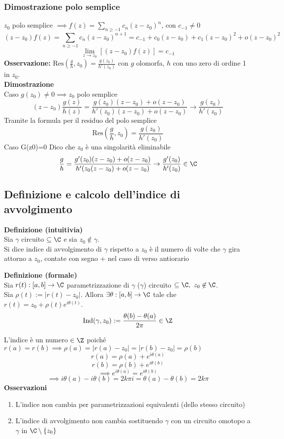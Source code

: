 \subsubsection*{Dimostrazione polo semplice}
$z_0$ polo semplice $\implies f(z)=\sum_{n\ge -1}^{} c_n(z-z_0)^n$, con $c_{-1}\neq  0$
\[(z-z_0)f(z)=\sum_{n\ge -1}^{} c_n(z-z_0)^{n+1}=c_{-1}+c_0(z-z_0)+c_1(z-z_0)^2+o(z-z_0)^2\]
\[\lim_{z \to z_0} [(z-z_0)f(z)]=c_{-1}\]
\textbf{Osservazione:} $\text{Res}(\frac{g}{h},z_0)=\frac{g(z_0)}{h'(z_0)}$ con $g$ olomorfa, $h$ con uno zero di ordine 1 in $z_0$.\\
\textbf{Dimostrazione}\\
Caso $g(z_0)\neq 0\implies z_0$ polo semplice 
\[(z-z_0) \frac{g(z)}{h(z)}= \frac{g(z_0)(z-z_0)+o(z-z_0)}{h'(z_0)(z-z_0)+o(z-z_0)}\to  \frac{g(z_0)}{h'(z_0)}\]
Tramite la formula per il residuo del polo semplice
\[\text{Res}( \frac{g}{h},z_0)= \frac{g(z_0)}{h'(z_0)}\]
Caso G(z0)=0
Dico che $z_0$ è una singolarità eliminabile
\[\frac{g}{h}= \frac{g'(z_0)(z-z_0)+o(z-z_0)}{h'(z_0(z-z_0)+o(z-z_0)}\to \frac{g'(z_0)}{h'(z_0)}\in\C\]
\subsection{Definizione e calcolo dell'indice di avvolgimento}
\begin{tcolorbox}
	\textbf{Definizione (intuitivia)}
	\\Sia $\gamma$ circuito $\subseteq \C$ e sia $z_0 \not\in \gamma$.
	\\Si dice indice di avvolgimento di $\gamma$ rispetto a $z_0$ è il numero di volte che $\gamma$ gira attorno a $z_0$, contate con segno + nel caso di verso antiorario
\end{tcolorbox}
\begin{tcolorbox}
	\textbf{Definizione (formale)} \\
	Sia $r(t):[a,b]\to \C$ parametrizzazione di $\gamma$ ($\gamma$) circuito $\subseteq \C,\ z_0 \not\in \C $.
	\\Sia $\rho (t):=|r(t)-z_0|$. Allora $\exists \theta:[a,b]\to \C$ tale che $r(t)=z_0+\rho(t)e^{i\theta(t)}$.
	\[\text{Ind}(\gamma,z_0):= \frac{\theta(b)-\theta(a)}{2\pi}\in\Z\]
\end{tcolorbox}
L'indice è un numero $\in\Z$ poiché $r(a)=r(b)\implies\rho(a)=|r(a)-z_0|=|r(b)-z_0|=\rho(b)$
\[r(a)=\rho (a)+e^{i\theta(a)}\]
\[r(b)=\rho(b)+e^{i\theta(b)}\]
\[\implies e^{i\theta(a)}=e^{i\theta(b)}\]
\[\implies i\theta(a)-i\theta(b)=2k\pi i = \theta(a)-\theta(b)=2k \pi\]
\textbf{Osservazioni}
\begin{enumerate}
	\item L'indice non cambia per parametrizzazioni equivalenti (dello stesso circuito)
	\item L'indice di avvolgimento non cambia sostituendo $\gamma$ con un circuito omotopo a $\gamma$ in $\C\setminus \{z_0\} $
\end{enumerate}
